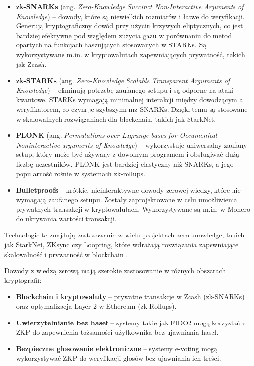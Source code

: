 \documentclass{article}
\begin{document}
\begin{itemize}
    \item \textbf{zk-SNARKs} (ang. \textit{Zero-Knowledge Succinct Non-Interactive Arguments of Knowledge}) – dowody, które są niewielkich rozmiarów i łatwe do weryfikacji. Generują kryptograficzny dowód przy użyciu krzywych eliptycznych, co jest bardziej efektywne pod względem zużycia gazu w porównaniu do metod opartych na funkcjach haszujących stosowanych w STARKs. Są wykorzystywane m.in. w kryptowalutach zapewniających prywatność, takich jak Zcash.
    
    \item \textbf{zk-STARKs} (ang. \textit{Zero-Knowledge Scalable Transparent Arguments of Knowledge}) – eliminują potrzebę zaufanego setupu i są odporne na ataki kwantowe. STARKs wymagają minimalnej interakcji między dowodzącym a weryfikatorem, co czyni je szybszymi niż SNARKs. Dzięki temu są stosowane w skalowalnych rozwiązaniach dla blockchain, takich jak StarkNet.
    
    \item \textbf{PLONK} (ang. \textit{Permutations over Lagrange-bases for Oecumenical Noninteractive arguments of Knowledge}) – wykorzystuje uniwersalny zaufany setup, który może być używany z dowolnym programem i obsługiwać dużą liczbę uczestników. PLONK jest bardziej elastyczny niż SNARKs, a jego popularność rośnie w systemach zk-rollups.
    
    \item \textbf{Bulletproofs} – krótkie, nieinteraktywne dowody zerowej wiedzy, które nie wymagają zaufanego setupu. Zostały zaprojektowane w celu umożliwienia prywatnych transakcji w kryptowalutach. Wykorzystywane są m.in. w Monero do ukrywania wartości transakcji.
\end{itemize}

Technologie te znajdują zastosowanie w wielu projektach zero-knowledge, takich jak StarkNet, ZKsync czy Loopring, które wdrażają rozwiązania zapewniające skalowalność i prywatność w blockchain \cite{zkp_chainlink}.

Dowody z wiedzą zerową mają szerokie zastosowanie w różnych obszarach kryptografii:

\begin{itemize}
    \item \textbf{Blockchain i kryptowaluty} – prywatne transakcje w Zcash (zk-SNARKs) oraz optymalizacja Layer 2 w Ethereum (zk-Rollups).
    \item \textbf{Uwierzytelnianie bez haseł} – systemy takie jak FIDO2 mogą korzystać z ZKP do zapewnienia tożsamości użytkownika bez ujawniania haseł.
    \item \textbf{Bezpieczne głosowanie elektroniczne} – systemy e-voting mogą wykorzystywać ZKP do weryfikacji głosów bez ujawniania ich treści.
\end{itemize}


  

\end{document}
